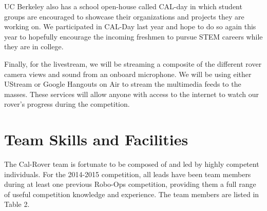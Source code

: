 \documentclass[titlepage,twocolumn,10pt]{article}
\begin{document}
    UC Berkeley also has a school open-house called CAL-day in which student groups are encouraged to showcase their organizations and projects they are working on. We participated in CAL-Day last year and hope to do so again this year to hopefully encourage the incoming freshmen to pursue STEM careers while they are in college.

    Finally, for the livestream, we will be streaming a composite of the different rover camera views and sound from an onboard microphone.  We will be using either UStream or Google Hangouts on Air to stream the multimedia feeds to the masses.  These services will allow anyone with access to the internet to watch our rover's progress during the competition.

    \section{Team Skills and Facilities}
    The Cal-Rover team is fortunate to be composed of and led by highly competent individuals. For the 2014-2015 competition, all leads have been team members during at least one previous Robo-Ops competition, providing them a full range of useful competition knowledge and experience.  The team members are listed in Table 2. 
\end{document}
